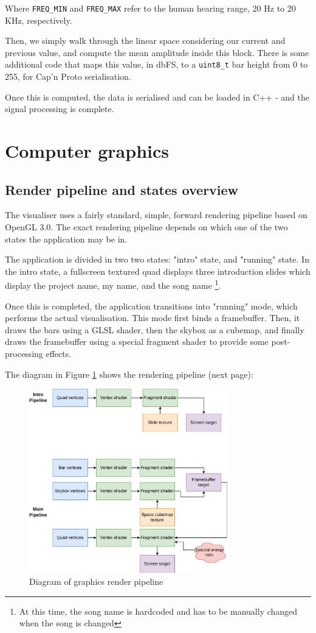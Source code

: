 \documentclass[11pt]{article}
\begin{document}
Where \verb|FREQ_MIN| and \verb|FREQ_MAX| refer to the human hearing range, 20 Hz to 20 KHz, respectively.

Then, we simply walk through the linear space considering our current and previous value, and compute the mean
amplitude inside this block. There is some additional code that maps this value, in dbFS, to a \verb|uint8_t|
bar height from 0 to 255, for Cap'n Proto serialisation.

Once this is computed, the data is serialised and can be loaded in C++ - and the signal processing is
complete.

\section{Computer graphics}
\subsection{Render pipeline and states overview}
The visualiser uses a fairly standard, simple, forward rendering pipeline based on OpenGL 3.0. The exact
rendering pipeline depends on which one of the two states the application may be in.

The application is divided in two two states: "intro" state, and "running" state. In the intro state, a
fullscreen textured quad displays three introduction slides which display the project name, my name, and the
song name \footnote{At this time, the song name is hardcoded and has to be manually changed when the song is
changed}.

Once this is completed, the application transitions into "running" mode, which performs the actual
visualisation. This mode first binds a framebuffer. Then, it draws the bars using a GLSL shader, then the
skybox as a cubemap, and finally draws the framebuffer using a special fragment shader to provide some
post-processing effects.

The diagram in Figure \ref{fig:renderpipe}
shows the rendering pipeline (next page):

\begin{figure}[H]
\centering
\includegraphics[width=330px]{img/renderpipe.drawio.pdf}
\caption{Diagram of graphics render pipeline}
\label{fig:renderpipe}
\end{figure}
\end{document}

